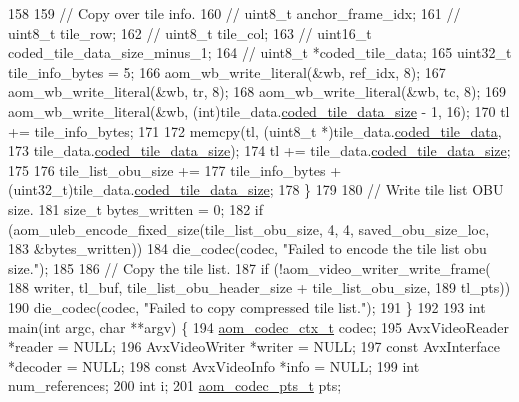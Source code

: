 \begin{DoxyCodeInclude}
{158 
159     \textcolor{comment}{// Copy over tile info.}
160     \textcolor{comment}{//  uint8\_t anchor\_frame\_idx;}
161     \textcolor{comment}{//  uint8\_t tile\_row;}
162     \textcolor{comment}{//  uint8\_t tile\_col;}
163     \textcolor{comment}{//  uint16\_t coded\_tile\_data\_size\_minus\_1;}
164     \textcolor{comment}{//  uint8\_t *coded\_tile\_data;}
165     uint32\_t tile\_info\_bytes = 5;
166     aom\_wb\_write\_literal(&wb, ref\_idx, 8);
167     aom\_wb\_write\_literal(&wb, tr, 8);
168     aom\_wb\_write\_literal(&wb, tc, 8);
169     aom\_wb\_write\_literal(&wb, (\textcolor{keywordtype}{int})tile\_data.\hyperlink{structaom__tile__data_a4451b0bcd81b4959484745df35a9fbba}{coded\_tile\_data\_size} - 1, 16);
170     tl += tile\_info\_bytes;
171 
172     memcpy(tl, (uint8\_t *)tile\_data.\hyperlink{structaom__tile__data_a05898249ddaf5ba799dd471113b0e51e}{coded\_tile\_data},
173            tile\_data.\hyperlink{structaom__tile__data_a4451b0bcd81b4959484745df35a9fbba}{coded\_tile\_data\_size});
174     tl += tile\_data.\hyperlink{structaom__tile__data_a4451b0bcd81b4959484745df35a9fbba}{coded\_tile\_data\_size};
175 
176     tile\_list\_obu\_size +=
177         tile\_info\_bytes + (uint32\_t)tile\_data.\hyperlink{structaom__tile__data_a4451b0bcd81b4959484745df35a9fbba}{coded\_tile\_data\_size};
178   \}
179 
180   \textcolor{comment}{// Write tile list OBU size.}
181   \textcolor{keywordtype}{size\_t} bytes\_written = 0;
182   \textcolor{keywordflow}{if} (aom\_uleb\_encode\_fixed\_size(tile\_list\_obu\_size, 4, 4, saved\_obu\_size\_loc,
183                                  &bytes\_written))
184     die\_codec(codec, \textcolor{stringliteral}{"Failed to encode the tile list obu size."});
185 
186   \textcolor{comment}{// Copy the tile list.}
187   \textcolor{keywordflow}{if} (!aom\_video\_writer\_write\_frame(
188           writer, tl\_buf, tile\_list\_obu\_header\_size + tile\_list\_obu\_size,
189           tl\_pts))
190     die\_codec(codec, \textcolor{stringliteral}{"Failed to copy compressed tile list."});
191 \}
192 
193 \textcolor{keywordtype}{int} main(\textcolor{keywordtype}{int} argc, \textcolor{keywordtype}{char} **argv) \{
194   \hyperlink{structaom__codec__ctx}{aom\_codec\_ctx\_t} codec;
195   AvxVideoReader *reader = NULL;
196   AvxVideoWriter *writer = NULL;
197   \textcolor{keyword}{const} AvxInterface *decoder = NULL;
198   \textcolor{keyword}{const} AvxVideoInfo *info = NULL;
199   \textcolor{keywordtype}{int} num\_references;
200   \textcolor{keywordtype}{int} i;
201   \hyperlink{group__encoder_ga958524226c9a65251c9e4f7bb78fc606}{aom\_codec\_pts\_t} pts;
}
\end{DoxyCodeInclude}
